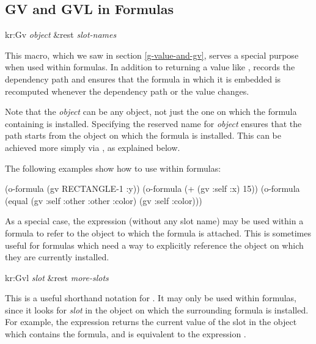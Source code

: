 \subsection{GV and GVL in Formulas}
\label{gv-in-form}

\value{f-top}
\begin{example}
kr:Gv {\it object} \&rest {\it slot-names}\value{macro}
\end{example}

This macro, which we saw in section \ref{g-value-and-gv}, serves a special
purpose when used within formulas.
In addition to returning a value like ,  records the
dependency path and ensures that the formula in
which it is embedded is recomputed whenever the dependency path or the
value changes.

Note that the {\it object} can be any object, not just the one on
which the formula containing  is installed.  Specifying the reserved
name  for {\it object} ensures that the path starts from the object on which the formula is installed.  This
can be achieved more simply via , as explained below.

The following examples show how to use  within formulas:
\begin{programexample}
(o-formula (gv RECTANGLE-1 :y))
(o-formula (+ (gv :self :x) 15))
(o-formula (equal (gv :self :other :other :color)
                  (gv :self :color)))

\end{programexample}

As a special case, the expression  (without any slot name) may
be used within a formula to refer to the object to which the formula is
attached.  This is sometimes useful for formulas which need a way to
explicitly reference the object on which they are currently installed.


\value{f-top}
\begin{example}
kr:Gvl {\it slot} \&rest {\it more-slots}\value{macro}
\end{example}

This is a useful shorthand notation for .  It may only be used within formulas, since it looks for
{\it slot} in the object on which the surrounding formula is installed.  For
example, the expression  returns the current value of the
 slot in the object which contains the formula, and
is equivalent to the expression .



